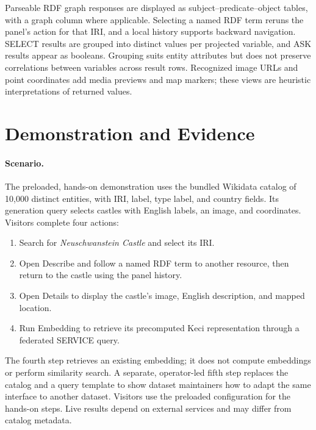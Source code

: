 Parseable RDF graph responses are displayed as subject--predicate--object tables, with a graph column where applicable. Selecting a named RDF term reruns the panel's action for that IRI, and a local history supports backward navigation. SELECT results are grouped into distinct values per projected variable, and ASK results appear as booleans. Grouping suits entity attributes but does not preserve correlations between variables across result rows. Recognized image URLs and point coordinates add media previews and map markers; these views are heuristic interpretations of returned values.

\section{Demonstration and Evidence}
\paragraph{Scenario.}
The preloaded, hands-on demonstration uses the bundled Wikidata catalog of 10,000 distinct entities, with IRI, label, type label, and country fields. Its generation query selects castles with English labels, an image, and coordinates. Visitors complete four actions:
\begin{enumerate}
\item Search for \emph{Neuschwanstein Castle} and select its IRI.
\item Open Describe and follow a named RDF term to another resource, then return to the castle using the panel history.
\item Open Details to display the castle's image, English description, and mapped location.
\item Run Embedding to retrieve its precomputed Keci representation through a federated SERVICE query.
\end{enumerate}
The fourth step retrieves an existing embedding; it does not compute embeddings or perform similarity search. A separate, operator-led fifth step replaces the catalog and a query template to show dataset maintainers how to adapt the same interface to another dataset. Visitors use the preloaded configuration for the hands-on steps. Live results depend on external services and may differ from catalog metadata.


